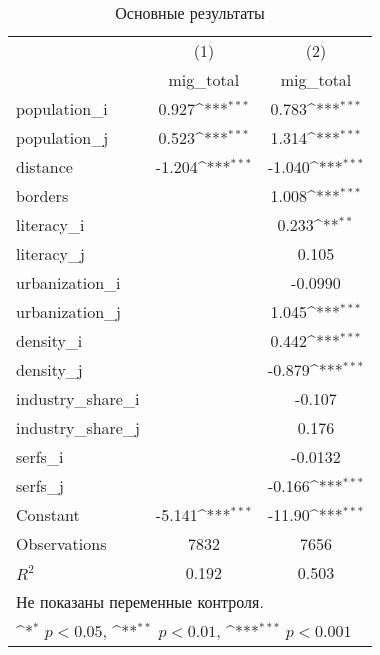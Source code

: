 \begin{table}[htbp]\centering
\def\sym#1{\ifmmode^{#1}\else\(^{#1}\)\fi}
\caption{Основные результаты\label{table:pres}}
\begin{tabular}{l*{2}{c}}
\hline\hline
                    &\multicolumn{1}{c}{(1)}&\multicolumn{1}{c}{(2)}\\
                    &\multicolumn{1}{c}{mig\_total}&\multicolumn{1}{c}{mig\_total}\\
\hline
population\_i        &       0.927\sym{***}&       0.783\sym{***}\\
population\_j        &       0.523\sym{***}&       1.314\sym{***}\\
distance            &      -1.204\sym{***}&      -1.040\sym{***}\\
borders             &                     &       1.008\sym{***}\\
literacy\_i          &                     &       0.233\sym{**} \\
literacy\_j          &                     &       0.105         \\
urbanization\_i      &                     &     -0.0990         \\
urbanization\_j      &                     &       1.045\sym{***}\\
density\_i           &                     &       0.442\sym{***}\\
density\_j           &                     &      -0.879\sym{***}\\
industry\_share\_i    &                     &      -0.107         \\
industry\_share\_j    &                     &       0.176         \\
serfs\_i             &                     &     -0.0132         \\
serfs\_j             &                     &      -0.166\sym{***}\\
Constant            &      -5.141\sym{***}&      -11.90\sym{***}\\
\hline
Observations        &        7832         &        7656         \\
\(R^{2}\)           &       0.192         &       0.503         \\
\hline\hline
\multicolumn{3}{l}{Не показаны переменные контроля.}\\
\multicolumn{3}{l}{\sym{*} \(p<0.05\), \sym{**} \(p<0.01\), \sym{***} \(p<0.001\)}\\
\end{tabular}
\end{table}
